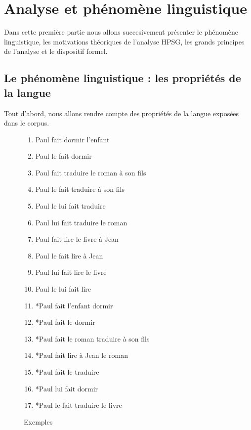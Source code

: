 %

\section {Analyse et phénomène linguistique}

Dans cette première partie nous allons succesivement présenter le phénomène linguistique, les motivations théoriques de l'analyse HPSG, les grands principes de l'analyse et le dispositif formel.

\newpage

\subsection{Le phénomène linguistique : les propriétés de la langue}

Tout d'abord, nous allons rendre compte des propriétés de la langue exposées dans le corpus.\\

\begin{figure}[ht]
\begin{enumerate}
  \item Paul fait dormir l'enfant
  \item Paul le fait dormir
  \item Paul fait traduire le roman à son fils
  \item Paul le fait traduire à son fils
  \item Paul le lui fait traduire
  \item Paul lui fait traduire le roman
  \item Paul fait lire le livre à Jean
  \item Paul le fait lire à Jean
  \item Paul lui fait lire le livre
  \item Paul le lui fait lire
  \item *Paul fait l'enfant dormir
  \item *Paul fait le dormir
  \item *Paul fait le roman traduire à son fils
  \item *Paul fait lire à Jean le roman
  \item *Paul fait le traduire
  \item *Paul lui fait dormir
  \item *Paul le fait traduire le livre
\end{enumerate}
\caption{Exemples \label{phenomene.exemples}}
\end{figure}


